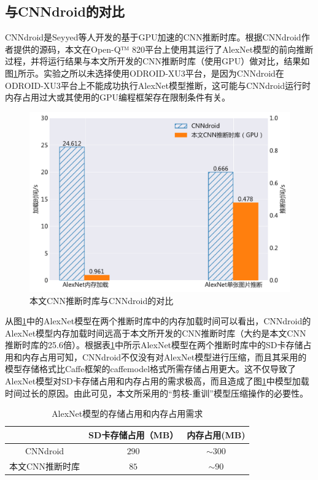 \subsection{与CNNdroid的对比}

CNNdroid是Seyyed等人开发的基于GPU加速的CNN推断时库。根据CNNdroid作者提供的源码，本文在Open-Q™ 820平台上使用其运行了AlexNet模型的前向推断过程，并将运行结果与本文所开发的CNN推断时库（使用GPU）做对比，结果如图\ref{figure:figuredroid}所示。实验之所以未选择使用ODROID-XU3平台，是因为CNNdroid在ODROID-XU3平台上不能成功执行AlexNet模型推断，这可能与CNNdroid运行时内存占用过大或其使用的GPU编程框架存在限制条件有关。

\begin{figure}[htbp]
    \centering
    \includegraphics[height=0.41\textwidth]{figures/cnndroid.pdf}
    \caption{本文CNN推断时库与CNNdroid的对比}\label{figure:figuredroid}
\end{figure}

从图\ref{figure:figuredroid}中的AlexNet模型在两个推断时库中的内存加载时间可以看出，CNNdroid的AlexNet模型内存加载时间远高于本文所开发的CNN推断时库（大约是本文CNN推断时库的25.6倍）。根据表\ref{table:tabledroid}中所示AlexNet模型在两个推断时库中的SD卡存储占用和内存占用可知，CNNdroid不仅没有对AlexNet模型进行压缩，而且其采用的模型存储格式比Caffe框架的caffemodel格式所需存储占用更大。这不仅导致了AlexNet模型对SD卡存储占用和内存占用的需求极高，而且造成了图\ref{figure:figuredroid}中模型加载时间过长的原因。由此可见，本文所采用的“剪枝-重训”模型压缩操作的必要性。


\begin{table}[htbp]
  \centering
  \caption{AlexNet模型的存储占用和内存占用需求}
  \label{table:tabledroid}
  \begin{tabular}{ccc}
    \toprule
       & SD卡存储占用（MB）& 内存占用(MB) \\
    \midrule
      CNNdroid & $290$ & $\sim 300$ \\
      本文CNN推断时库& $85$ & $\sim 90$ \\
    \bottomrule
  \end{tabular}
\end{table}


